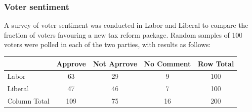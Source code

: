 \documentclass[a4paper]{article}
\begin{document}
\subsubsection{Voter sentiment}
A survey of voter sentiment was conducted in Labor and Liberal to compare the fraction of voters favouring a new tax reform package. Random samples of 100 voters were polled in each of the two parties, with results as follows:
\begin{table}[H]
	\centering
	\begin{tabular}{@{}lcccc@{}}
	\toprule
				 & Approve & Not Aprrove & No Comment & Row Total \\ \midrule
	Labor        & 63      & 29          & 9          & 100       \\
	Liberal      & 47      & 46          & 7          & 100       \\ \midrule
	Column Total & 109     & 75          & 16         & 200       \\ \bottomrule
	\end{tabular}
\end{table}
\end{document}
